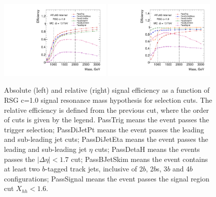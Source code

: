 \begin{figure}
\begin{center}
\includegraphics[width=0.48\textwidth,angle=-90]{figures/boosted/SigEff/evtsel_Moriond_Efficiency_PreSel.pdf}
\includegraphics[width=0.48\textwidth,angle=-90]{figures/boosted/SigEff/evtsel_Moriond_Efficiency_PreSel_rel.pdf}
  \caption{Absolute (left) and relative (right) signal efficiency as a function of RSG c=1.0 signal resonance mass hypothesis for selection cuts. The relative efficiency is defined from the previous cut, where the order of cuts is given by the legend. PassTrig means the event passes the trigger selection; PassDiJetPt means the event passes the leading and sub-leading jet \pt cuts; PassDiJetEta means the event passes the leading and sub-leading jet $\eta$ cuts; PassDetaH means the events passes the $|\Delta \eta| < 1.7$ cut; PassBJetSkim means the event contains at least two $b$-tagged track jets, inclusive of 2$b$, 2$b$s, 3$b$ and 4$b$ configurations; PassSignal means the event passes the signal region cut $X_{hh} < 1.6$.}
  \label{fig:boosted-selection-efficiency}
\end{center}
\end{figure}

